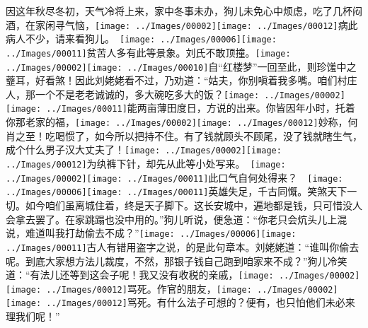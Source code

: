 因这年秋尽冬初，天气冷将上来，家中冬事未办，狗儿未免心中烦虑，吃了几杯闷酒，在家闲寻气恼，{{\texttt{[image: ../Images/00002]}\texttt{[image: ../Images/00012]}\footnotesize \kaishu 病此病人不少，请来看狗儿。　}\texttt{[image: ../Images/00006]}\texttt{[image: ../Images/00011]}\footnotesize \kaishu 贫苦人多有此等景象。}刘氏不敢顶撞。{\texttt{[image: ../Images/00002]}\texttt{[image: ../Images/00010]}\footnotesize \kaishu 自``红楼梦''一回至此，则珍馐中之虀耳，好看煞！}因此刘姥姥看不过，乃劝道：``姑夫，你别嗔着我多嘴。咱们村庄人，那一个不是老老诚诚的，多大碗吃多大的饭？{\texttt{[image: ../Images/00002]}\texttt{[image: ../Images/00011]}\footnotesize \kaishu 能两亩薄田度日，方说的出来。}你皆因年小时，托着你那老家的福，{\texttt{[image: ../Images/00002]}\texttt{[image: ../Images/00012]}\footnotesize \kaishu 妙称，何肖之至！}吃喝惯了，如今所以把持不住。有了钱就顾头不顾尾，没了钱就瞎生气，成个什么男子汉大丈夫了！{{\texttt{[image: ../Images/00002]}\texttt{[image: ../Images/00012]}\footnotesize \kaishu 为纨裤下针，却先从此等小处写来。　\texttt{[image: ../Images/00002]}\texttt{[image: ../Images/00011]}\footnotesize \kaishu 此口气自何处得来？　}\texttt{[image: ../Images/00006]}\texttt{[image: ../Images/00011]}\footnotesize \kaishu 英雄失足，千古同慨。笑煞天下一切。}如今咱们虽离城住着，终是天子脚下。这长安城中，遍地都是钱，只可惜没人会拿去罢了。在家跳蹋也没中用的。''狗儿听说，便急道：``你老只会炕头儿上混说，难道叫我打劫偷去不成？''{\texttt{[image: ../Images/00006]}\texttt{[image: ../Images/00011]}\footnotesize \kaishu 古人有错用盗字之说，的是此句章本。}刘姥姥道：``谁叫你偷去呢。到底大家想方法儿裁度，不然，那银子钱自己跑到咱家来不成？''狗儿冷笑道：``有法儿还等到这会子呢！我又没有收税的亲戚，{\texttt{[image: ../Images/00002]}\texttt{[image: ../Images/00012]}\footnotesize \kaishu 骂死。}作官的朋友，{\texttt{[image: ../Images/00002]}\texttt{[image: ../Images/00012]}\footnotesize \kaishu 骂死。}有什么法子可想的？便有，也只怕他们未必来理我们呢！''

